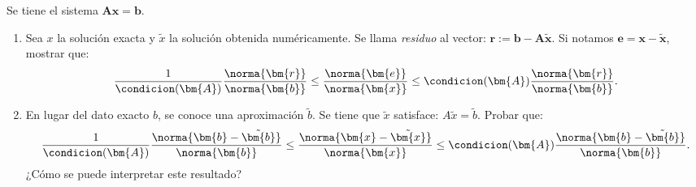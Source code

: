 \begin{enunciado}{\ejercicio}
  Se tiene el sistema $\bm{A}\bm{x} = \bm{b}$.
  \begin{enumerate}[label=(\alph*)]
    \item Sea  $x$ la solución exacta y $\tilde{x}$ la solución obtenida numéricamente.
          Se llama \textit{residuo} al vector: $\bm{r} := \bm{b} - \bm{A}\tilde{\bm{x}}$.
          Si notamos $\bm{e} = \bm{x} - \tilde{\bm{x}}$, mostrar que:
          $$
            \frac{1}{\condicion(\bm{A})}  \frac{\norma{\bm{r}}}{\norma{\bm{b}}}
            \leq
            \frac{\norma{\bm{e}}}{\norma{\bm{x}}}
            \leq
            \condicion(\bm{A}) \frac{\norma{\bm{r}}}{\norma{\bm{b}}}.
          $$

    \item En lugar del dato exacto $b$, se conoce una aproximación $\tilde{b}$.
          Se tiene que $\tilde{x}$ satisface: $A\tilde{x} = \tilde{b}.$
          Probar que:
          $$
            \frac{1}{\condicion(\bm{A})}  \frac{\norma{\bm{b} - \tilde{\bm{b}}}}{\norma{\bm{b}}}
            \leq
            \frac{\norma{\bm{x} - \tilde{\bm{x}}}}{\norma{\bm{x}}}
            \leq
            \condicion(\bm{A})  \frac{\norma{\bm{b} - \tilde{\bm{b}}}}{\norma{\bm{b}}}.
          $$
          ¿Cómo se puede interpretar este resultado?
  \end{enumerate}
\end{enunciado}

\medskip


